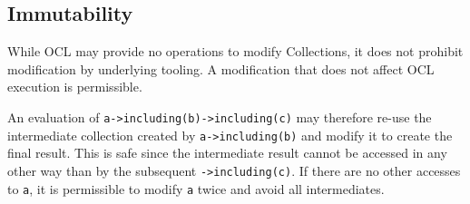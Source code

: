 \documentclass{llncs}
\begin{document}





\subsection{Immutability}

While OCL may provide no operations to modify Collections, it does not prohibit modification by underlying tooling. A modification that does not affect OCL execution is permissible.

An evaluation of \verb$a->including(b)->including(c)$ may therefore re-use the intermediate collection created by \verb$a->including(b)$ and modify it to create the final result. This is safe since the intermediate result cannot be accessed in any other way than by the subsequent \verb$->including(c)$. If there are no other accesses to \verb$a$, it is permissible to
modify \verb$a$ twice and avoid all intermediates.
\end{document}
